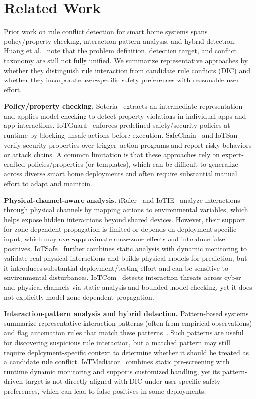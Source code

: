 \section{Related Work}

Prior work on rule conflict detection for smart home systems spans policy/property checking, interaction-pattern analysis, and hybrid detection. Huang et al.~\cite{huang2023survey} note that the problem definition, detection target, and conflict taxonomy are still not fully unified. We summarize representative approaches by whether they distinguish rule interaction from candidate rule conflicts (DIC) and whether they incorporate user-specific safety preferences with reasonable user effort.

\textbf{Policy/property checking.} Soteria~\cite{celik2018soteria} extracts an intermediate representation and applies model checking to detect property violations in individual apps and app interactions. IoTGuard~\cite{celik2019iotguard} enforces predefined safety/security policies at runtime by blocking unsafe actions before execution. SafeChain~\cite{hsu2019safechain} and IoTSan~\cite{nguyen2018iotsan} verify security properties over trigger--action programs and report risky behaviors or attack chains. A common limitation is that these approaches rely on expert-crafted policies/properties (or templates), which can be difficult to generalize across diverse smart home deployments and often require substantial manual effort to adapt and maintain.

\textbf{Physical-channel-aware analysis.} iRuler~\cite{wang2019charting} and IoTIE~\cite{chen2019multi} analyze interactions through physical channels by mapping actions to environmental variables, which helps expose hidden interactions beyond shared devices. However, their support for zone-dependent propagation is limited or depends on deployment-specific input, which may over-approximate cross-zone effects and introduce false positives. IoTSafe~\cite{ding2021iotsafe} further combines static analysis with dynamic monitoring to validate real physical interactions and builds physical models for prediction, but it introduces substantial deployment/testing effort and can be sensitive to environmental disturbances. IoTCom~\cite{alhanahnah2022iotcom} detects interaction threats across cyber and physical channels via static analysis and bounded model checking, yet it does not explicitly model zone-dependent propagation.

\textbf{Interaction-pattern analysis and hybrid detection.} Pattern-based systems summarize representative interaction patterns (often from empirical observations) and flag automation rules that match these patterns~\cite{trimananda2020understanding,chi2020cross,chi2023detecting}. Such patterns are useful for discovering suspicious rule interaction, but a matched pattern may still require deployment-specific context to determine whether it should be treated as a candidate rule conflict. IoTMediator~\cite{chi2023detecting} combines static pre-screening with runtime dynamic monitoring and supports customized handling, yet its pattern-driven target is not directly aligned with DIC under user-specific safety preferences, which can lead to false positives in some deployments.

